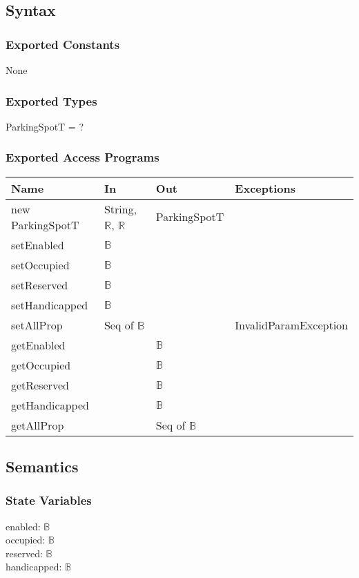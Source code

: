 \documentclass[12pt, titlepage]{article}
\begin{document}
\subsection{Syntax}

\subsubsection{Exported Constants}
None

\subsubsection{Exported Types}
ParkingSpotT = ?

\subsubsection{Exported Access Programs}

\begin{tabular}{l l l l}
\hline
\textbf{Name} & \textbf{In} & \textbf{Out} & \textbf{Exceptions} \\
\hline
new ParkingSpotT & String, $\mathbb{R}$, $\mathbb{R}$ & ParkingSpotT & ~ \\
setEnabled & $\mathbb{B}$ & ~ & ~\\
setOccupied & $\mathbb{B}$ & ~ & ~\\
setReserved & $\mathbb{B}$ & ~ & ~\\
setHandicapped & $\mathbb{B}$ & ~ & ~\\
setAllProp & Seq of $\mathbb{B}$ & ~ & InvalidParamException\\
getEnabled & ~ & $\mathbb{B}$ & ~\\
getOccupied & ~ & $\mathbb{B}$ & ~\\
getReserved & ~ & $\mathbb{B}$ & ~\\
getHandicapped & ~ & $\mathbb{B}$ & ~\\
getAllProp & ~ & Seq of $\mathbb{B}$ & ~\\
\hline
\end{tabular}

\subsection{Semantics}

\subsubsection{State Variables}
enabled: $\mathbb{B}$\\
occupied: $\mathbb{B}$\\
reserved: $\mathbb{B}$\\
handicapped: $\mathbb{B}$\\
\end{document}
